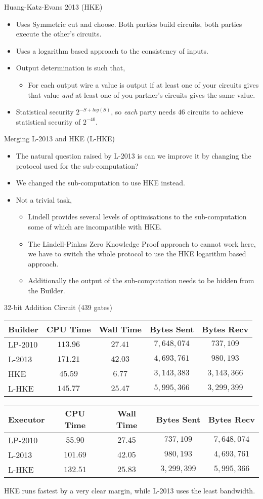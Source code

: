 \documentclass[t, 12pt]{beamer}            %
\newcommand{\AdditionTable}
{
	\begin{block}{32-bit Addition Circuit (439 gates)}
		\begin{tabular}{| p{1.6cm} || c c | c c |}
		\hline
		\textbf{Builder} & \textbf{CPU Time} & \textbf{Wall Time} & \textbf{Bytes Sent} & \textbf{Bytes Recv} \\
		\hline
		\hline
		LP-2010 & $113.96$ & $27.41$ & $7,648,074$ & $737,109$ \\
		\hline
		L-2013 & $171.21$ & $42.03$ & $4,693,761$ & $980,193$ \\
		\hline
		HKE & $45.59$ & $6.77$ & $3,143,383$ & $3,143,366$ \\
		\hline
		L-HKE & $145.77$ & $25.47$ & $5,995,366$ & $3,299,399$ \\
		\hline
		\end{tabular}

		\vspace{0.2cm}

		\begin{tabular}{| p{1.6cm} || c c | c c |}
		\hline
		\textbf{Executor} & \textbf{CPU Time} & \textbf{Wall Time} & \textbf{Bytes Sent} & \textbf{Bytes Recv} \\
		\hline
		\hline
		LP-2010 & $55.90$ & $27.45$ & $737,109$ & $7,648,074$ \\
		\hline
		L-2013 & $101.69$ & $42.05$ & $980,193$ & $4,693,761$ \\
		\hline
		L-HKE & $132.51$ & $25.83$ & $3,299,399$ & $5,995,366$ \\
		\hline
		\end{tabular}
	\end{block}
}
\begin{document}
\begin{frame}{Huang-Katz-Evans 2013 (HKE)}
	\begin{itemize} %
		\item Uses Symmetric cut and choose. Both parties build circuits, both parties execute the other's circuits.
		\item Uses a logarithm based approach to the consistency of inputs.
		\item Output determination is such that,
		\begin{itemize}
			\item For each output wire a value is output if at least one of your circuits gives that value \emph{and} at least one of you partner's circuits gives the same value.
		\end{itemize}
		\item Statistical security $2^{-S + log(S)}$, so \emph{each} party needs $46$ circuits to achieve statistical security of $2^{-40}$.
	\end{itemize}

\end{frame}


\begin{frame}{Merging L-2013 and HKE (L-HKE)}
	\begin{itemize} %
		\item The natural question raised by L-2013 is can we improve it by changing the protocol used for the sub-computation?
		\item We changed the sub-computation to use HKE instead.
		\item Not a trivial task,
		\begin{itemize}
			\item Lindell provides several levels of optimisations to the sub-computation some of which are incompatible with HKE.
			\item The Lindell-Pinkas Zero Knowledge Proof approach to cannot work here, we have to switch the whole protocol to use the HKE logarithm based approach.
			\item Additionally the output of the sub-computation needs to be hidden from the Builder. %
		\end{itemize}
	\end{itemize}
\end{frame}


\begin{frame}
	\AdditionTable
	HKE runs fastest by a very clear margin, while L-2013 uses the least bandwidth.
\end{frame}
\end{document}
